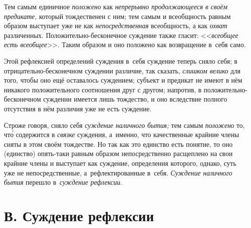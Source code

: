 Тем самым единичное {\em положено} как {\em непрерывно продолжающееся в своём
предикате,} который тождественен с ним; тем самым и всеобщность равным образом
выступает уже не как {\em непосредственная} всеобщность, а как {\em охват}
различенных. Положительно-бесконечное суждение также гласит: <<{\em всеобщее
есть всеобщее}>>. Таким образом и оно положено как возвращение в~себя само.

Этой рефлексией определений суждения в~себя суждение теперь сняло себя; в
отрицательно-бесконечном суждении различие, так сказать, {\em слишком велико}
для того, чтобы оно ещё оставалось суждением; субъект и предикат не имеют в нём
никакого положительного соотношения друг с другом; напротив, в
положительно-бесконечном суждении имеется лишь тождество, и оно вследствие
полного отсутствия в нём различия уже не есть суждение.

Строже говоря, сняло себя {\em суждение наличного бытия;} тем самым {\em
положено} то, чт\'{о} содержится в {\em связке} суждения, а~именно,
что качественные крайние члены сняты в этом своём тождестве. Но так
как это единство есть понятие, то оно (единство) опять-таки равным образом
непосредственно расщеплено на свои крайние члены и выступает как суждение,
определения которого, однако, суть уже не непосредственные, а~рефлектированные
в~себя. {\em Суждение наличного бытия} перешло в~{\em суждение рефлексии}.

\section[В. Суждение рефлексии]{В. Суждение рефлексии}

